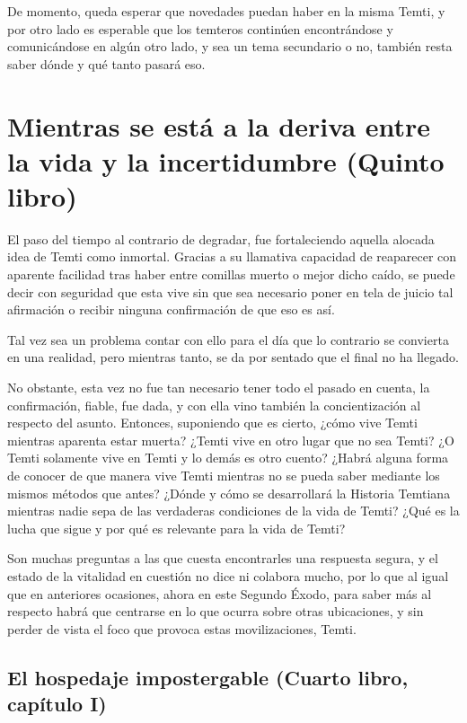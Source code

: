 \documentclass[
]{book}
\begin{document}
De momento, queda esperar que novedades puedan haber en la misma Temti, y por otro lado es esperable que los temteros continúen encontrándose y comunicándose en algún otro lado, y sea un tema secundario o no, también resta saber dónde y qué tanto pasará eso.

\hypertarget{mientras-se-estuxe1-a-la-deriva-entre-la-vida-y-la-incertidumbre-quinto-libro}{%
\chapter{Mientras se está a la deriva entre la vida y la incertidumbre (Quinto libro)}\label{mientras-se-estuxe1-a-la-deriva-entre-la-vida-y-la-incertidumbre-quinto-libro}}

El paso del tiempo al contrario de degradar, fue fortaleciendo aquella alocada idea de Temti como inmortal. Gracias a su llamativa capacidad de reaparecer con aparente facilidad tras haber entre comillas muerto o mejor dicho caído, se puede decir con seguridad que esta vive sin que sea necesario poner en tela de juicio tal afirmación o recibir ninguna confirmación de que eso es así.

Tal vez sea un problema contar con ello para el día que lo contrario se convierta en una realidad, pero mientras tanto, se da por sentado que el final no ha llegado.

No obstante, esta vez no fue tan necesario tener todo el pasado en cuenta, la confirmación, fiable, fue dada, y con ella vino también la concientización al respecto del asunto. Entonces, suponiendo que es cierto, ¿cómo vive Temti mientras aparenta estar muerta? ¿Temti vive en otro lugar que no sea Temti? ¿O Temti solamente vive en Temti y lo demás es otro cuento? ¿Habrá alguna forma de conocer de que manera vive Temti mientras no se pueda saber mediante los mismos métodos que antes? ¿Dónde y cómo se desarrollará la Historia Temtiana mientras nadie sepa de las verdaderas condiciones de la vida de Temti? ¿Qué es la lucha que sigue y por qué es relevante para la vida de Temti?

Son muchas preguntas a las que cuesta encontrarles una respuesta segura, y el estado de la vitalidad en cuestión no dice ni colabora mucho, por lo que al igual que en anteriores ocasiones, ahora en este Segundo Éxodo, para saber más al respecto habrá que centrarse en lo que ocurra sobre otras ubicaciones, y sin perder de vista el foco que provoca estas movilizaciones, Temti.

\hypertarget{el-hospedaje-impostergable-cuarto-libro-capuxedtulo-i}{%
\section{El hospedaje impostergable (Cuarto libro, capítulo I)}\label{el-hospedaje-impostergable-cuarto-libro-capuxedtulo-i}}
\end{document}
